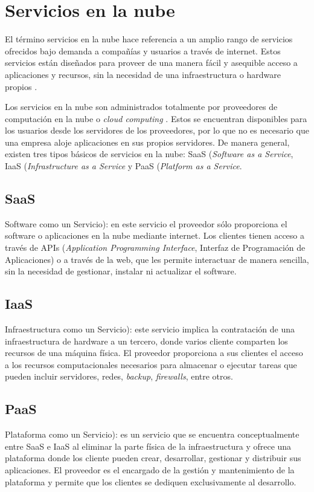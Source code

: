 \section{Servicios en la nube}
El término servicios en la nube hace referencia a un amplio rango de servicios ofrecidos bajo demanda a compañías y usuarios a través de internet. Estos servicios están diseñados para proveer de una manera fácil y asequible acceso a aplicaciones y recursos, sin la necesidad de una infraestructura o hardware propios \cite{cs_def}.

Los servicios en la nube son administrados totalmente por proveedores de computación en la nube o \textit{cloud computing} \cite{cs_def}. Estos se encuentran disponibles para los usuarios desde los servidores de los proveedores, por lo que no es necesario que una empresa aloje aplicaciones en sus propios servidores. De manera general, existen tres tipos básicos de servicios en la nube: SaaS (\textit{Software as a Service}, IaaS (\textit{Infrastructure as a Service} y PaaS (\textit{Platform as a Service}.

\subsection{SaaS}
Software como un Servicio): en este servicio el proveedor sólo proporciona el software o aplicaciones en la nube mediante internet. Los clientes tienen acceso a través de APIs (\textit{Application Programming Interface}, Interfaz de Programación de Aplicaciones) o a través de la web, que les permite interactuar de manera sencilla, sin la necesidad de gestionar, instalar ni actualizar el software.

\subsection{IaaS}
Infraestructura como un Servicio): este servicio implica la contratación de una infraestructura de hardware a un tercero, donde varios cliente comparten los recursos de una máquina física. El proveedor proporciona a sus clientes el acceso a los recursos computacionales necesarios para almacenar o ejecutar tareas que pueden incluir servidores, redes, \textit{backup}, \textit{firewalls}, entre otros.

\subsection{PaaS}
Plataforma como un Servicio): es un servicio que se encuentra conceptualmente entre SaaS e IaaS al eliminar la parte física de la infraestructura y ofrece una plataforma donde los cliente pueden crear, desarrollar, gestionar y distribuir sus aplicaciones. El proveedor es el encargado de la gestión y mantenimiento de la plataforma y permite que los clientes se dediquen exclusivamente al desarrollo.

